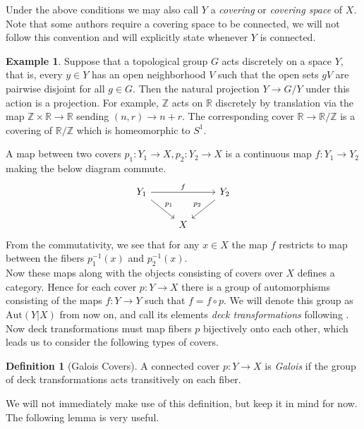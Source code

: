\documentclass{article}
\theoremstyle{definition}
\newtheorem{definition}[theorem]{Definition}
\newtheorem{example}[theorem]{Example}
\theoremstyle{remark}
\newcommand{\R}{\mathbb{R}}
\newcommand{\Z}{\mathbb{Z}}
\begin{document}
Under the above conditions we may also call $Y$ a \textit{covering} or \textit{covering space} of $X$.
Note that some authors require a covering space to be connected, we will not follow this convention and will explicitly state whenever $Y$ is connected.\\

\begin{example} Suppose that a topological group $G$ acts discretely on a space $Y$, that is, every $y \in Y$ has an open neighborhood $V$ such that the open sets $gV$ are pairwise disjoint for all $g  \in G$.
	Then the natural projection $Y \to G/Y$ under this action is a projection.
	For example, $\Z$ acts on $\R$ discretely by translation via the map $\Z \times \R \to \R$ sending $(n,r) \to n+r$.
	The corresponding cover $\R \to \R/\Z$ is a covering of $\R/\Z$ which is homeomorphic to $S^1$.
\end{example}

\indent A map between two covers $p_1: Y_1 \to X, p_2: Y_2 \to X$ is a continuous map $f: Y_1 \to Y_2$ making the below diagram commute.
\[\begin{tikzcd}
	{Y_1} && {Y_2} \\
	& X
	\arrow["f", from=1-1, to=1-3]
	\arrow["{p_1}", from=1-1, to=2-2]
	\arrow["{p_2}"', from=1-3, to=2-2]
\end{tikzcd}\]
From the commutativity, we see that for any $x \in X$ the map $f$ restricts to map between the fibers $p_1^{-1}(x)$ and $p_2^{-1}(x)$.\\
\indent Now these maps along with the objects consisting of covers over $X$ defines a category.
Hence for each cover $p:Y \to X$ there is a group of automorphisms consisting of the maps $f: Y \to Y$ such that $f = f \circ p$.
We will denote this group as $\text{Aut}(Y|X)$ from now on, and call its elements \textit{deck transformations} following \cite{FomenkoFuchs}.
Now deck transformations must map fibers $p$ bijectively onto each other, which leads us to consider the following types of covers.

\begin{definition}[Galois Covers]
	A connected cover $p: Y \to X$ is \textit{Galois} if the group of deck transformations acts transitively on each fiber.
\end{definition}

We will not immediately make use of this definition, but keep it in mind for now.
The following lemma is very useful.
\end{document}
